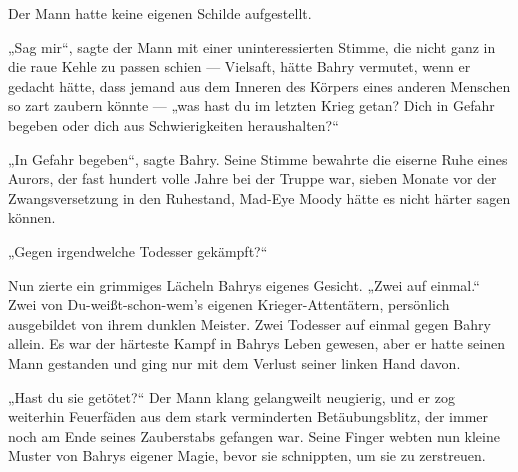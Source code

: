 Der Mann hatte keine eigenen Schilde aufgestellt.

„Sag mir“, sagte der Mann mit einer uninteressierten Stimme, die nicht ganz in die raue Kehle zu passen schien — Vielsaft, hätte Bahry vermutet, wenn er gedacht hätte, dass jemand aus dem Inneren des Körpers eines anderen Menschen so zart zaubern könnte — „was hast du im letzten Krieg getan? Dich in Gefahr begeben oder dich aus Schwierigkeiten heraushalten?“

„In Gefahr begeben“, sagte Bahry. Seine Stimme bewahrte die eiserne Ruhe eines Aurors, der fast hundert volle Jahre bei der Truppe war, sieben Monate vor der Zwangsversetzung in den Ruhestand, Mad-Eye Moody hätte es nicht härter sagen können.

„Gegen irgendwelche Todesser gekämpft?“

Nun zierte ein grimmiges Lächeln Bahrys eigenes Gesicht.
„Zwei auf einmal.“ Zwei von Du-weißt-schon-wem’s eigenen Krieger-Attentätern, persönlich ausgebildet von ihrem dunklen Meister. Zwei Todesser auf einmal gegen Bahry allein. Es war der härteste Kampf in Bahrys Leben gewesen, aber er hatte seinen Mann gestanden und ging nur mit dem Verlust seiner linken Hand davon.

„Hast du sie getötet?“ Der Mann klang gelangweilt neugierig, und er zog weiterhin Feuerfäden aus dem stark verminderten Betäubungsblitz, der immer noch am Ende seines Zauberstabs gefangen war. Seine Finger webten nun kleine Muster von Bahrys eigener Magie, bevor sie schnippten, um sie zu zerstreuen.

